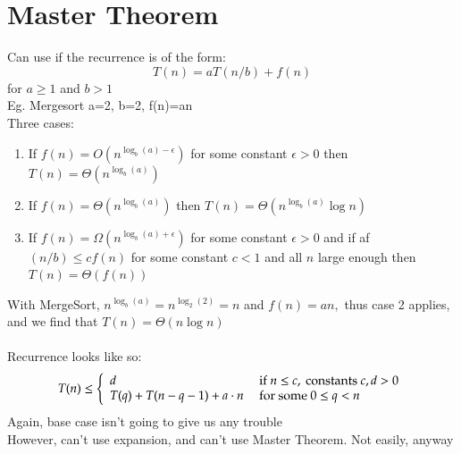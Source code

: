 \documentclass{article}[18pt]
\begin{document}
\section{Master Theorem}
Can use if the recurrence is of the form:
$$T(n) = aT(n/b) + f (n)$$
for $a\geqslant 1$ and $b>1$\\
Eg. Mergesort a=2, b=2, f(n)=an\\
Three cases:
\begin{enumerate}
	\item If $f ( n ) = O \left( n ^ { \log _ { b } ( a ) - \epsilon } \right)$ for some constant $\epsilon > 0$ then
	$T ( n ) = \Theta \left( n ^ { \log _ { b } ( a ) } \right)$
	\item If $f ( n ) = \Theta \left( n ^ { \log _ { b } ( a ) } \right)$ then $T ( n ) = \Theta \left( n ^ { \log _ { b } ( a ) } \log n \right)$
	\item If $f ( n ) = \Omega \left( n ^ { \log _ { b } ( a ) + \epsilon } \right)$ for some constant $\epsilon > 0$ and if
	af $( n / b ) \leq c f ( n )$ for some constant $c < 1$ and all $n$ large
	enough then $T ( n ) = \Theta ( f ( n ) )$
\end{enumerate}
With MergeSort, $n ^ { \log _ { b } ( a ) } = n ^ { \log _ { 2 } ( 2 ) } = n$ and $f ( n ) = a n ,$ thus case 2
applies, and we find that $T ( n ) = \Theta ( n \log n )$\\
\\
Recurrence looks like so:
$$T ( n ) \leq \left\{ \begin{array} { l l } { d } & { \text { if } n \leq c , \text { constants } c , d > 0 } \\ { T ( q ) + T ( n - q - 1 ) + a \cdot n } & { \text { for some } 0 \leq q < n } \end{array} \right.$$
Again, base case isn't going to give us any trouble\\
However, can't use expansion, and can't use Master Theorem. Not easily, anyway
\end{document}
